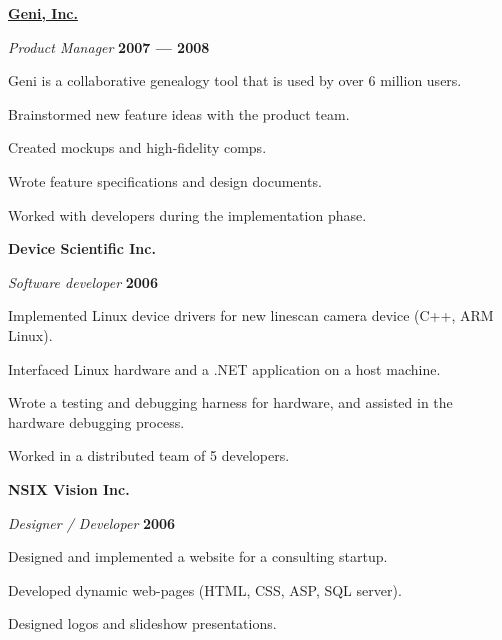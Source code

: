 \documentclass[10pt]{article}
\newenvironment{outerlist}[1][\enskip\textbullet]%
        {\begin{enumerate}[#1]}{\end{enumerate}%
         \vspace{-.6\baselineskip}}
\newenvironment{innerlist}[1][\enskip\textbullet]%
        {\begin{compactenum}[#1]}{\end{compactenum}}
\begin{document}
{\textbf{ \href{http://www.geni.com}{Geni, Inc.}  }}
\begin{outerlist}
\item[] \textit{Product Manager}%
        \hfill \textbf{2007 --- 2008}
\begin{innerlist}
\item Geni is a collaborative genealogy tool that is used by over 6 million users.
\item Brainstormed new feature ideas with the product team.
\item Created mockups and high-fidelity comps.
\item Wrote feature specifications and design documents.
\item Worked with developers during the implementation phase.\\
\end{innerlist}
\end{outerlist}


{\textbf{Device Scientific Inc.}}
\begin{outerlist}

\item[] \textit{Software developer}%
        \hfill \textbf{2006}
\begin{innerlist}
\item Implemented Linux device drivers for new linescan camera device (C++, ARM Linux).
\item Interfaced Linux hardware and a .NET application on a host machine.
\item Wrote a testing and debugging harness for hardware, and assisted in the hardware debugging process.
\item Worked in a distributed team of 5 developers.\\
\end{innerlist}
\end{outerlist}


\textbf{NSIX Vision Inc.}
\begin{outerlist}
\item[] \textit{Designer / Developer}%
        \hfill \textbf{2006}
\begin{innerlist}
\item Designed and implemented a website for a consulting startup.
\item Developed dynamic web-pages (HTML, CSS, ASP, SQL server).
\item Designed logos and slideshow presentations.\\
\end {innerlist}
\end{outerlist}
\end{document}
